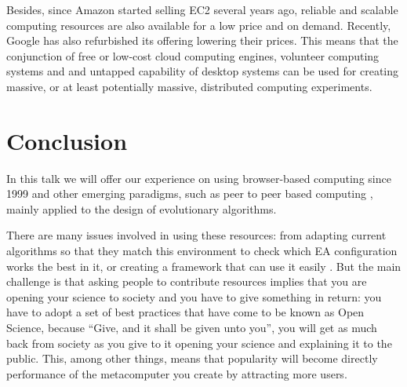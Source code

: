 \documentclass{svmult}
\begin{document}
Besides, since Amazon started selling EC2 several years ago, reliable and scalable computing resources are also available for a low price and on demand. Recently, Google has also refurbished its offering lowering their prices. This means that the conjunction of free or low-cost cloud computing engines, volunteer computing systems and and untapped capability of desktop systems can be used for creating massive, or at least potentially massive, distributed computing experiments.

\section{Conclusion}

In this talk we will offer our experience on using browser-based computing since 1999 \cite{jesusIWANN99} and other emerging paradigms, such as peer to peer based computing \cite{evag:gpem}, mainly applied to the design of evolutionary algorithms. 

There are many issues involved in using these resources: from adapting current algorithms so that they match this environment \cite{agajaj} to check which EA configuration works the best in it, or creating a framework that can use it easily \cite{nodeo2014}. But the main challenge is that asking people to contribute resources implies that you are opening your science to society and you have to give something in return: you have to adopt a set of best practices that have come to be known as Open Science, because ``Give, and it shall be given unto you'', you will get as much back from society as you give to it opening your science and explaining it to the public. This, among other things, means that popularity will become directly performance of the metacomputer you create by attracting more users.





\end{document}
